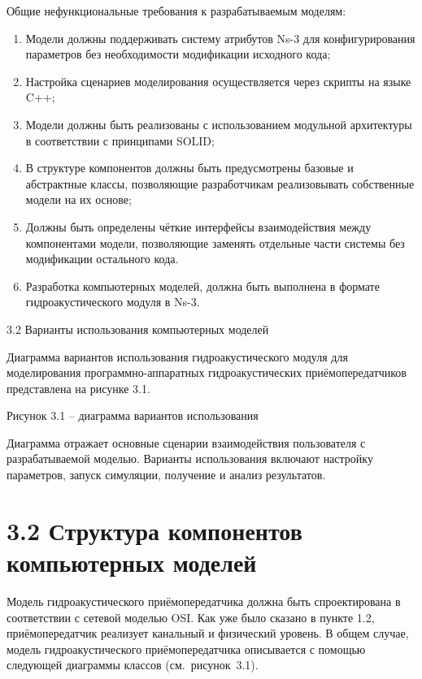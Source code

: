Общие нефункциональные требования к разрабатываемым моделям:

\begin{enumerate}
\def\labelenumi{\arabic{enumi}.}
\item
  Модели должны поддерживать систему атрибутов Ns-3 для конфигурирования
  параметров без необходимости модификации исходного кода;
\item
  Настройка сценариев моделирования осуществляется через скрипты на
  языке C++;
\item
  Модели должны быть реализованы с использованием модульной архитектуры
  в соответствии с принципами SOLID;
\item
  В структуре компонентов должны быть предусмотрены базовые и
  абстрактные классы, позволяющие разработчикам реализовывать
  собственные модели на их основе;
\item
  Должны быть определены чёткие интерфейсы взаимодействия между
  компонентами модели, позволяющие заменять отдельные части системы без
  модификации остального кода.
\item
  Разработка компьютерных моделей, должна быть выполнена в формате
  гидроакустического модуля в Ns-3.
\end{enumerate}

3.2 Варианты использования компьютерных моделей

Диаграмма вариантов использования гидроакустического модуля для
моделирования программно-аппаратных гидроакустических приёмопередатчиков
представлена на рисунке 3.1.

Рисунок 3.1 -- диаграмма вариантов использования

Диаграмма отражает основные сценарии взаимодействия пользователя с
разрабатываемой моделью. Варианты использования включают настройку
параметров, запуск симуляции, получение и анализ результатов.

\section*{3.2 Структура компонентов компьютерных
моделей}\label{ux441ux442ux440ux443ux43aux442ux443ux440ux430-ux43aux43eux43cux43fux43eux43dux435ux43dux442ux43eux432-ux43aux43eux43cux43fux44cux44eux442ux435ux440ux43dux44bux445-ux43cux43eux434ux435ux43bux435ux439}

Модель гидроакустического приёмопередатчика должна быть спроектирована в
соответствии с сетевой моделью OSI. Как уже было сказано в пункте 1.2,
приёмопередатчик реализует канальный и физический уровень. В общем
случае, модель гидроакустического приёмопередатчика описывается с
помощью следующей диаграммы классов (см.~рисунок~3.1).

